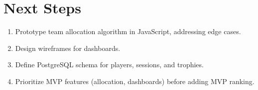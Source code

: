 \documentclass{article}
\begin{document}
\section{Next Steps}
\begin{enumerate}
    \item Prototype team allocation algorithm in JavaScript, addressing edge cases.
    \item Design wireframes for dashboards.
    \item Define PostgreSQL schema for players, sessions, and trophies.
    \item Prioritize MVP features (allocation, dashboards) before adding MVP ranking.
\end{enumerate}
\end{document}
